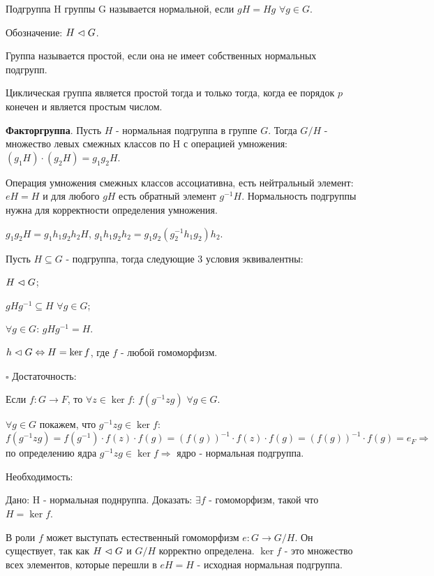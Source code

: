 \documentclass[../main.tex]{subfiles}
\begin{document}
\void
{} Подгруппа H группы G называется нормальной, если $gH = Hg$ $\forall g\in G$.

Обозначение: $H \vartriangleleft G$.

\void
{} Группа называется простой, если она не имеет собственных нормальных подгрупп.

\void
{} Циклическая группа является простой тогда и только тогда, когда ее порядок
$p$ конечен и является простым числом.

\void
{} \textbf{Факторгруппа}. Пусть $H$ - нормальная подгруппа в группе $G$. Тогда $G/H$ - множество
левых смежных классов по H с операцией умножения: $(g_1H)\cdot(g_2H) = g_1g_2H$.

\void
{} Операция умножения смежных классов ассоциативна, есть нейтральный элемент: $eH = H$ и
для любого $gH$ есть обратный элемент $g^{-1}H$. Нормальность подгруппы нужна для корректности
определения умножения.

$g_1g_2H = g_1h_1g_2h_2H$, $g_1h_1g_2h_2 = g_1g_2(g_2^{-1}h_1g_2)h_2$.

\void
{} Пусть $H\subseteq G$ - подгруппа, тогда следующие 3 условия эквивалентны:

\void{} $H\vartriangleleft G$;

\void{} $gHg^{-1}\subseteq H$ $\forall g\in G$;

\void{} $\forall g\in G$: $gHg^{-1} = H$.

\void
{} $h\vartriangleleft G \Leftrightarrow H = \ker{f}$, где $f$ - любой гомоморфизм.

\void
$\square$ Достаточность:

Если $f: G\rightarrow F$, то $\forall z\in \ker{f}$: $f(g^{-1}zg)$ $\forall g\in G$.

$\forall g\in G$ покажем, что $g^{-1}zg \in \ker{f}$: $f(g^{-1}zg) = f(g^{-1})\cdot f(z)\cdot f(g) =
(f(g))^{-1}\cdot f(z)\cdot f(g) = (f(g))^{-1}\cdot f(g) = e_F \Rightarrow$ по определению ядра
$g^{-1}zg\in \ker{f} \Rightarrow$ ядро - нормальная подгруппа.

\void
Необходимость:

Дано: H - нормальная поднруппа. Доказать: $\exists f$ - гомоморфизм, такой что $H = \ker{f}$.

В роли $f$ может выступать естественный гомоморфизм $e: G\rightarrow G/H$. Он существует,
так как $H\vartriangleleft G$ и $G/H$ корректно определена. $\ker{f}$ - это множество всех элементов,
которые перешли в $eH = H$ - исходная нормальная подгруппа.
\end{document}
